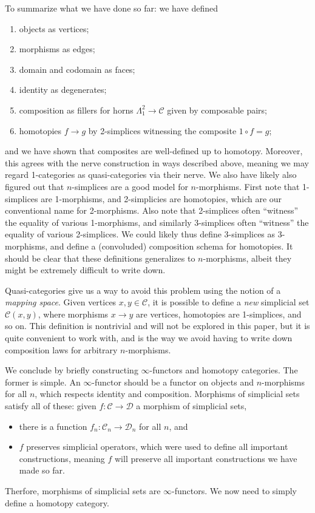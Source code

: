 To summarize what we have done so far: we have defined
\begin{enumerate}
	\item objects as vertices;
	\item morphisms as edges;
	\item domain and codomain as faces;
	\item identity as degenerates;
	\item composition as fillers for horns $\Lambda _1^2 \to \mathcal{C} $ given by composable pairs;
	\item homotopies $f\to g$ by 2-simplices witnessing the composite $1 \circ f=g$;
\end{enumerate}
and we have shown that composites are well-defined up to homotopy. Moreover, this agrees with the nerve construction in ways described above, meaning we may regard 1-categories as quasi-categories via their nerve. We also have likely also figured out that $n$-simplices are a good model for $n$-morphisms. First note that 1-simplices are 1-morphisms, and 2-simplicies are homotopies, which are our conventional name for 2-morphisms. Also note that 2-simplices often ``witness'' the equality of various 1-morphisms, and similarly 3-simplices often ``witness'' the equality of various 2-simplices. We could likely thus define 3-simplices as 3-morphisms, and define a (convoluded) composition schema for homotopies. It should be clear that these definitions generalizes to $n$-morphisms, albeit they might be extremely difficult to write down.

Quasi-categories give us a way to avoid this problem using the notion of a \emph{mapping space}. Given vertices $x,y\in \mathcal{C} $, it is possible to define a \emph{new} simplicial set $\mathcal{C} (x,y)$, where morphisms $x\to y$ are vertices, homotopies are 1-simplices, and so on. This definition is nontrivial and will not be explored in this paper, but it is quite convenient to work with, and is the way we avoid having to write down composition laws for arbitrary $n$-morphisms.

We conclude by briefly constructing $\infty $-functors and homotopy categories. The former is simple. An $\infty $-functor should be a functor on objects and $n$-morphisms for all $n$, which respects identity and composition. Morphisms of simplicial sets satisfy all of these: given $f : \mathcal{C}  \to \mathcal{D} $ a morphism of simplicial sets,
\begin{itemize}
	\item there is a function $f_n : \mathcal{C} _n \to \mathcal{D} _n$ for all $n$, and
	\item $f$ preserves simplicial operators, which were used to define all important constructions, meaning $f$ will preserve all important constructions we have made so far.
\end{itemize}
Therfore, morphisms of simplicial sets are $\infty $-functors. We now need to simply define a homotopy category.

